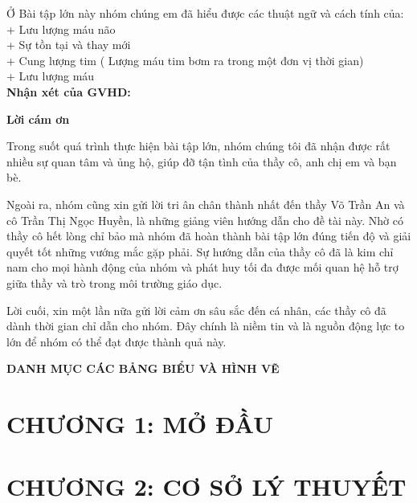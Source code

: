 \documentclass[12pt,a4paper]{article}
\begin{document}
Ở Bài tập lớn này nhóm chúng em đã hiểu được các thuật ngữ và cách tính của:\\
+ Lưu lượng máu não\\
+ Sự tồn tại và thay mới\\
+ Cung lượng tim ( Lượng máu tim bơm ra trong một đơn vị thời gian)\\
+ Lưu lượng máu \\


\textbf{Nhận xét của GVHD:}

\newpage
\begin{center}
	\large\textbf{Lời cám ơn}
\end{center}

Trong suốt quá trình thực hiện bài tập lớn, nhóm chúng tôi đã nhận được rất nhiều sự quan tâm và ủng hộ, giúp đỡ tận tình của thầy cô, anh chị em và bạn bè.


Ngoài ra, nhóm cũng xin gửi lời tri ân chân thành nhất đến thầy Võ Trần An và cô Trần Thị Ngọc Huyền, là những giảng viên hướng dẫn cho đề tài  này. Nhờ có thầy cô hết lòng chỉ bảo mà nhóm đã hoàn thành bài tập lớn đúng tiến độ và giải quyết tốt những vướng mắc gặp phải. Sự hướng dẫn của thầy cô đã là kim chỉ nam cho mọi hành động của nhóm và phát huy tối đa được mối quan hệ hỗ trợ giữa thầy  và trò trong môi trường giáo dục.


Lời cuối, xin một lần nữa gửi lời cảm ơn sâu sắc đến cá nhân, các thầy cô đã dành thời gian chỉ dẫn cho nhóm. Đây chính là niềm tin và là nguồn động lực to lớn để nhóm có thể đạt được thành quả này.

\newpage
\begin{center}
\tableofcontents
\end{center}

\newpage
\begin{center}
	\large\textbf{DANH MỤC CÁC BẢNG BIỂU VÀ HÌNH VẼ}
\end{center}
\listoftables{}
\listoffigures{}

\newpage
{}
\section*{CHƯƠNG 1: MỞ ĐẦU}

\newpage
{}
\section*{CHƯƠNG 2: CƠ SỞ LÝ THUYẾT}
\setcounter{section}{2}
\end{document}
